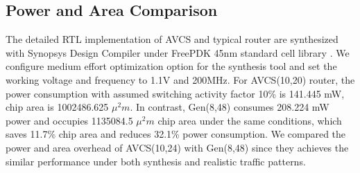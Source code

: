 \documentclass[paper]{ieice}
\begin{document}
\subsection{Power and Area Comparison}\label{area}
The detailed RTL implementation of AVCS and typical router are synthesized with Synopsys Design Compiler under FreePDK 45nm standard cell library \cite{nangate}. We configure medium effort optimization option for the synthesis tool and set the working voltage and frequency to 1.1V and 200MHz. For AVCS(10,20) router, the power consumption with assumed switching activity factor 10\% is 141.445 mW, chip area is 1002486.625 $\mu^2 m$. In contrast, Gen(8,48) consumes 208.224 mW power and occupies 1135084.5 $\mu^2 m$ chip area under the same conditions, which saves 11.7\% chip area and reduces 32.1\% power consumption. We compared the power and area overhead of AVCS(10,24) with Gen(8,48) since they achieves the similar performance under both synthesis and realistic traffic patterns.
\end{document}
